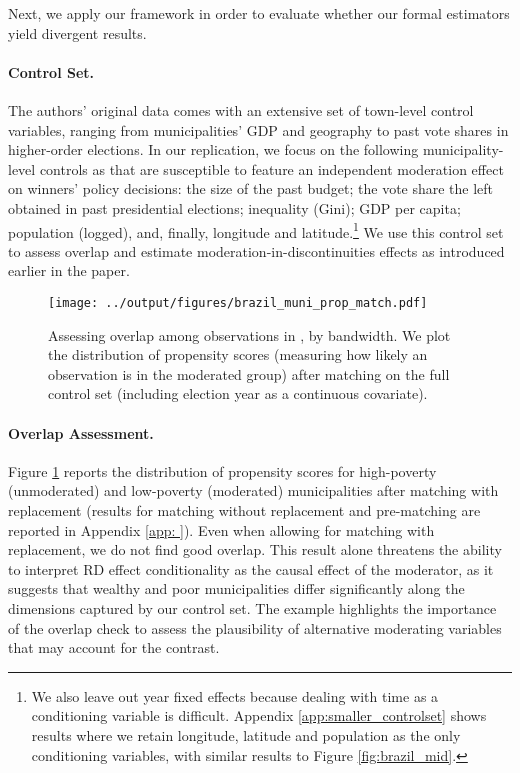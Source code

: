 \documentclass[12pt]{article}
\begin{document}
Next, we apply our framework in order to evaluate whether our formal estimators yield divergent results.

\paragraph*{Control Set.} The authors' original data comes with an extensive set of town-level control variables, ranging from municipalities' GDP and geography to past vote shares in higher-order elections. In our replication, we focus on the following municipality-level controls as that are susceptible to feature an independent moderation effect on winners' policy decisions: the size of the past budget; the vote share the left obtained in past presidential elections; inequality (Gini); GDP per capita; population (logged), and, finally, longitude and latitude.\footnote{We also leave out year fixed effects because dealing with time as a conditioning variable is difficult. Appendix \ref{app:smaller_controlset} shows results where we retain longitude, latitude and population as the only conditioning variables, with similar results to Figure \ref{fig:brazil_mid}.} We use this control set to assess overlap and estimate moderation-in-discontinuities effects as introduced earlier in the paper.

\begin{figure}[htbp]
  \centering
  \texttt{[image: ../output/figures/brazil\_muni\_prop\_match.pdf]}
  \caption{Assessing overlap among observations in \citet{desai2021}, by bandwidth. We plot the distribution of propensity scores (measuring how likely an observation is in the moderated group) after matching on the full control set (including election year as a continuous covariate). }
  \label{fig:brazil_match}
\end{figure}


\paragraph*{Overlap Assessment.} Figure \ref{fig:brazil_match} reports the distribution of propensity scores for high-poverty (unmoderated) and low-poverty (moderated) municipalities after matching with replacement (results for matching without replacement and pre-matching are reported in Appendix \ref{app:
}). Even when allowing for matching with replacement, we do not find good overlap. This result alone threatens the ability to interpret RD effect conditionality as the causal effect of the moderator, as it suggests that wealthy and poor municipalities differ significantly along the dimensions captured by our control set. The example highlights the importance of the overlap check to assess the plausibility of alternative moderating variables that may account for the contrast.
\end{document}
